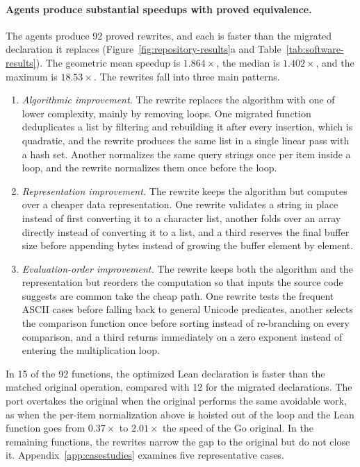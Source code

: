 \documentclass{article}
\begin{document}
\paragraph{Agents produce substantial speedups with proved equivalence.}
The agents produce 92 proved rewrites, and each is faster than the migrated declaration it replaces (Figure~\ref{fig:repository-results}a and Table~\ref{tab:software-results}).
The geometric mean speedup is $1.864\times$, the median is $1.402\times$, and the maximum is $18.53\times$.
The rewrites fall into three main patterns.
\begin{enumerate}[leftmargin=*]
    \item \emph{Algorithmic improvement.} The rewrite replaces the algorithm with one of lower complexity, mainly by removing loops. One migrated function deduplicates a list by filtering and rebuilding it after every insertion, which is quadratic, and the rewrite produces the same list in a single linear pass with a hash set. Another normalizes the same query strings once per item inside a loop, and the rewrite normalizes them once before the loop.
    \item \emph{Representation improvement.} The rewrite keeps the algorithm but computes over a cheaper data representation. One rewrite validates a string in place instead of first converting it to a character list, another folds over an array directly instead of converting it to a list, and a third reserves the final buffer size before appending bytes instead of growing the buffer element by element.
    \item \emph{Evaluation-order improvement.} The rewrite keeps both the algorithm and the representation but reorders the computation so that inputs the source code suggests are common take the cheap path. One rewrite tests the frequent ASCII cases before falling back to general Unicode predicates, another selects the comparison function once before sorting instead of re-branching on every comparison, and a third returns immediately on a zero exponent instead of entering the multiplication loop.
\end{enumerate}
In 15 of the 92 functions, the optimized Lean declaration is faster than the matched original operation, compared with 12 for the migrated declarations.
The port overtakes the original when the original performs the same avoidable work, as when the per-item normalization above is hoisted out of the loop and the Lean function goes from $0.37\times$ to $2.01\times$ the speed of the Go original.
In the remaining functions, the rewrites narrow the gap to the original but do not close it.
Appendix~\ref{app:casestudies} examines five representative cases.
\end{document}
